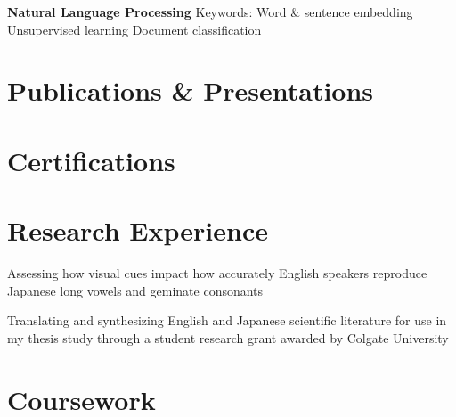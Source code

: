 \documentclass[letterpaper]{deedy-resume_sm}
\begin{document}
\textbf{Natural Language Processing}
Keywords: Word \& sentence embedding \textbullet{} Unsupervised learning \textbullet{} Document classification

\section{Publications \& Presentations}

\section{Certifications}

\section{Research Experience}
\begin{tightitemize}
\item Assessing how visual cues impact how accurately English speakers reproduce Japanese long vowels and geminate consonants
\end{tightitemize}
\sectionspace

\begin{tightitemize}
\item Translating and synthesizing English and Japanese scientific literature for use in my thesis study through a student research grant awarded by Colgate University
\end{tightitemize}
\sectionspace

\section{Coursework}
\end{document}
